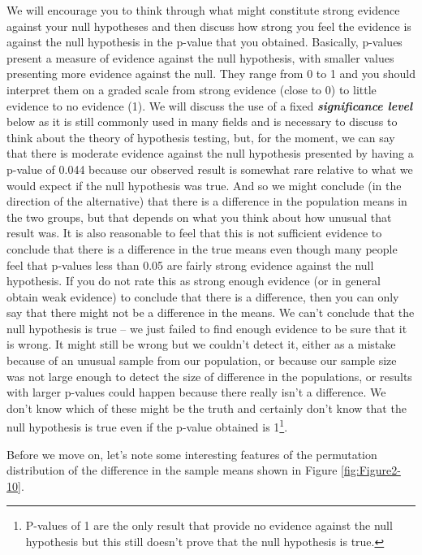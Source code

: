 \documentclass[
]{book}
\begin{document}
We will encourage you to think through what might constitute strong evidence
against your null hypotheses and then discuss how strong you feel the evidence
is against the null hypothesis in the p-value that you obtained. Basically,
p-values present a measure of evidence against the null hypothesis,
with smaller
values presenting more evidence against the null. They range from 0 to 1 and you
should interpret them on a graded scale from strong evidence (close to 0) to little evidence to no
evidence (1). We will discuss the use of a fixed \textbf{\emph{significance level}}
below as it is still commonly used in many fields and is necessary to discuss to think
about the theory of hypothesis testing, but, for the moment,
we can say that there is moderate evidence against the null hypothesis
presented by having a p-value of 0.044 because our observed result is somewhat
rare relative to what we would expect if the null hypothesis was true. And so
we might conclude (in the direction
of the alternative) that there is a difference in the population means in the
two groups, but that depends on what you think about how unusual that result was. It is also reasonable to feel that this is not sufficient evidence to conclude that there is a difference in the true means even though many people feel that p-values less than 0.05 are fairly strong evidence against the null hypothesis. If you do not rate this as strong enough evidence (or in general obtain weak evidence) to conclude that there is a difference, then you can only say that there might not be a difference in the means. We can't conclude that the null hypothesis is true -- we just failed to find enough evidence to be sure that it is wrong. It might still be wrong but we couldn't detect it, either as a mistake because of an unusual sample from our population, or because our sample size was not large enough to detect the size of difference in the populations, or results with larger p-values could happen because there really isn't a difference. We don't know which of these might be the truth and certainly don't know that the null hypothesis is true even if the p-value obtained is 1\footnote{P-values of 1 are the only result that provide no evidence against the null hypothesis but this still doesn't prove that the null hypothesis is true.}.

\indent Before we move on, let's note some interesting features of the permutation
distribution of the difference in the sample means shown in
Figure \ref{fig:Figure2-10}. 
\end{document}
